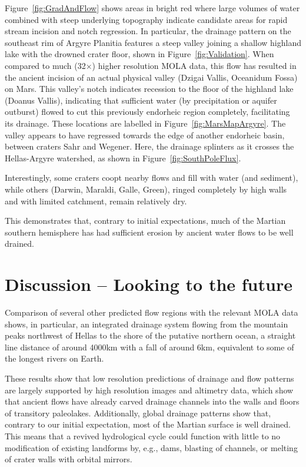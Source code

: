 \documentclass[12pt]{iopart}
\numberwithin{equation}{section}
\begin{document}
Figure~\ref{fig:GradAndFlow} shows areas in bright red where large volumes of water combined with steep underlying topography indicate candidate areas for rapid stream incision and notch regression. In particular, the drainage pattern on the southeast rim of Argyre Planitia features a steep valley joining a shallow highland lake with the drowned crater floor, shown in Figure~\ref{fig:Validation}. When compared to much (32$\times$) higher resolution MOLA data, this flow has resulted in the ancient incision of an actual physical valley (Dzigai Vallis, Oceanidum Fossa) on Mars. This valley's notch indicates recession to the floor of the highland lake (Doanus Vallis), indicating that sufficient water (by precipitation or aquifer outburst) flowed to cut this previously endorheic region completely, facilitating its drainage. These locations are labelled in Figure~\ref{fig:MarsMapArgyre}. The valley appears to have regressed towards the edge of another endorheic basin, between craters Sahr and Wegener. Here, the drainage splinters as it crosses the Hellas-Argyre watershed, as shown in Figure~\ref{fig:SouthPoleFlux}.

Interestingly, some craters coopt nearby flows and fill with water (and sediment), while others (Darwin, Maraldi, Galle, Green), ringed completely by high walls and with limited catchment, remain relatively dry.

This demonstrates that, contrary to initial expectations, much of the Martian southern hemisphere has had sufficient erosion by ancient water flows to be well drained.

\section{Discussion -- Looking to the future}

Comparison of several other predicted flow regions with the relevant MOLA data shows, in particular, an integrated drainage system flowing from the mountain peaks northwest of Hellas to the shore of the putative northern ocean, a straight line distance of around 4000km with a fall of around 6km, equivalent to some of the longest rivers on Earth\cite{longrivers}. 

These results show that low resolution predictions of drainage and flow patterns are largely supported by high resolution images and altimetry data, which show that ancient flows have already carved drainage channels into the walls and floors of transitory paleolakes. Additionally, global drainage patterns show that, contrary to our initial expectation, most of the Martian surface is well drained. This means that a revived hydrological cycle could function with little to no modification of existing landforms by, e.g., dams, blasting of channels, or melting of crater walls with orbital mirrors. 
\end{document}
